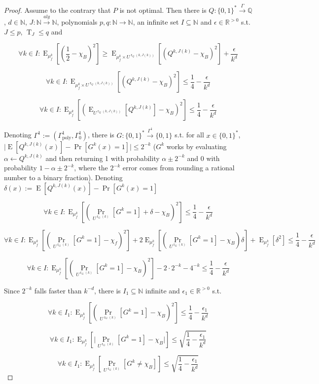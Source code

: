 \documentclass{article}
\theoremstyle{definition}
\theoremstyle{plain}
\newcommand{\Words}{{\{ 0, 1 \}^*}}
\newcommand{\Bool}{\{0,1\}}
\DeclareMathOperator{\Prb}{Pr}
\DeclareMathOperator{\E}{E}
\DeclareMathOperator{\T}{T}
\DeclareMathOperator{\R}{r}
\newcommand{\Nats}{\mathbb{N}}
\newcommand{\Rats}{\mathbb{Q}}
\newcommand{\Reals}{\mathbb{R}}
\newcommand{\Abs}[1]{\lvert #1 \rvert}
\begin{document}
\begin{proof}

Assume to the contrary that $P$ is not optimal. Then there is ${Q: \Words \xrightarrow{\Gamma} \Rats}$, $d \in \Nats$, $J: \Nats \xrightarrow{alg} \Nats$, polynomials $p,q: \Nats \rightarrow \Nats$, an infinite set ${I \subseteq \Nats}$ and $\epsilon \in \Reals^{>0}$ s.t. $J \leq p$, $\T_J \leq q$ and

$$ \forall k \in I: \E_{\mu_f^k}[(\frac{1}{2}-\chi_B)^2] \geq \E_{\mu_f^k \times U^{\R_Q(k,J(k))}}[(Q^{k,J(k)}-\chi_B)^2] +\frac{\epsilon}{k^d}$$

$$ \forall k \in I: \E_{\mu_f^k \times U^{\R_Q(k,J(k))}}[(Q^{k,J(k)}-\chi_B)^2] \leq \frac{1}{4} - \frac{\epsilon}{k^d} $$

$$ \forall k \in I: \E_{\mu_f^k}[(\E_{U^{\R_Q(k,J(k))}}[Q^{k,J(k)}]-\chi_B)^2] \leq \frac{1}{4} - \frac{\epsilon}{k^d} $$

Denoting $\Gamma^1:=(\Gamma_{\text{poly}}^1,\Gamma_0^1)$, there is $G: \Words \xrightarrow{\Gamma^1} \Bool$ s.t. for all ${x \in \Words}$, ${\Abs{\E[Q^{k,J(k)}(x)]-\Pr[G^k(x)=1]}\leq 2^{-k}}$ ($G^k$ works by evaluating ${\alpha \leftarrow Q^{k,J(k)}}$ and then returning 1 with probability $\alpha \pm 2^{-k}$ and 0 with probability $1-\alpha \pm 2^{-k}$, where the $2^{-k}$ error comes from rounding a rational number to a binary fraction). Denoting $\delta(x):=\E[Q^{k,J(k)}(x)]-\Pr[G^k(x)=1]$

$$ \forall k \in I: \E_{\mu_f^k}[(\Prb_{U^{\R_G(k)}}[G^k=1]+\delta-\chi_B)^2] \leq \frac{1}{4} - \frac{\epsilon}{k^d} $$

$$ \forall k \in I: \E_{\mu_f^k}[(\Prb_{U^{\R_G(k)}}[G^k=1]-\chi_f)^2]+2 \E_{\mu_f^k}[(\Prb_{U^{\R_G(k)}}[G^k=1]-\chi_B)\delta]+\E_{\mu_f^k}[\delta^2] \leq \frac{1}{4} - \frac{\epsilon}{k^d}$$

$$ \forall k \in I: \E_{\mu_f^k}[(\Prb_{U^{\R_G(k)}}[G^k=1]-\chi_B)^2]-2 \cdot 2^{-k}- 4^{-k} \leq \frac{1}{4} - \frac{\epsilon}{k^d}$$

Since $2^{-k}$ falls faster than $k^{-d}$, there is $I_1 \subseteq \Nats$ infinite and $\epsilon_1 \in \Reals^{>0}$ s.t.

$$ \forall k \in I_1: \E_{\mu_f^k}[(\Prb_{U^{\R_G(k)}}[G^k=1]-\chi_B)^2] \leq \frac{1}{4} - \frac{\epsilon_1}{k^d}$$

$$ \forall k \in I_1: \E_{\mu_f^k}[\Abs{\Prb_{U^{\R_G(k)}}[G^k=1]-\chi_B}] \leq \sqrt{\frac{1}{4} - \frac{\epsilon_1}{k^d}} $$

$$ \forall k \in I_1: \E_{\mu_f^k}[\Prb_{U^{\R_G(k)}}[G^k \ne \chi_B]] \leq \sqrt{\frac{1}{4} - \frac{\epsilon_1}{k^d}} $$


\end{proof}
\end{document}
